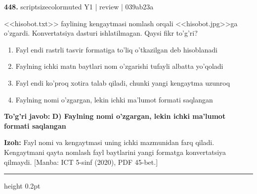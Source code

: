 \documentclass[10pt,a4paper]{article}
\begin{document}
{\bfseries\sffamily\color{ink} 448.} {scriptsizecolor{muted} Y1 | review | 039ab23a}
\par
<<hisobot.txt>> faylining kengaytmasi nomlash orqali <<hisobot.jpg>>ga o'zgardi. Konvertatsiya dasturi ishlatilmagan. Qaysi fikr to'g'ri?
\begin{enumerate}[label=\Alph*),leftmargin=9mm]
\item Fayl endi rastrli tasvir formatiga to'liq o'tkazilgan deb hisoblanadi
\item Faylning ichki matn baytlari nom o'zgarishi tufayli albatta yo'qoladi
\item Fayl endi ko'proq xotira talab qiladi, chunki yangi kengaytma uzunroq
\item Faylning nomi o'zgargan, lekin ichki ma'lumot formati saqlangan
\end{enumerate}
\begin{tcolorbox}[enhanced,breakable,colback=teal!4,colframe=teal!60!black,boxrule=0.45pt,arc=1.2mm,left=2.7mm,right=2.7mm,top=1.8mm,bottom=1.8mm,before skip=2mm,after skip=2mm]
{\bfseries\sffamily\color{teal}To'g'ri javob:} \textbf{D) Faylning nomi o'zgargan, lekin ichki ma'lumot formati saqlangan}
\par\smallskip
{\bfseries Izoh:} Fayl nomi va kengaytmasi uning ichki mazmunidan farq qiladi. Kengaytmani qayta nomlash fayl baytlarini yangi formatga konvertatsiya qilmaydi. [Manba: ICT 5-sinf (2020), PDF 45-bet.]
\end{tcolorbox}
\vspace{2mm}\hrule height 0.2pt\vspace{3mm}
\end{document}
